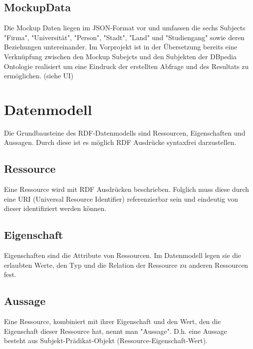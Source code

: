 \subsection*{MockupData}

Die Mockup Daten liegen im JSON-Format vor und umfassen die sechs Subjects "Firma", "Universität", "Person", "Stadt", "Land" und "Studiengang" sowie deren Beziehungen untereinander.
Im Vorprojekt ist in der Übersetzung bereits eine Verknüpfung zwischen den Mockup Subejcts und den Subjekten der DBpedia Ontologie realisiert um eine Eindruck der erstellten Abfrage und des Resultats zu ermöglichen. (siehe UI)

\section{Datenmodell}

Die Grundbausteine des RDF-Datenmodells sind Ressourcen, Eigenschaften und Aussagen. Durch diese ist es möglich RDF Ausdrücke syntaxfrei darzustellen.

\subsection*{Ressource}

Eine Ressource wird mit RDF Ausdrücken beschrieben. Folglich muss diese durch eine URI (Universal Resource Identifier) referenzierbar sein und eindeutig von dieser identifiziert werden können.

\subsection*{Eigenschaft}

Eigenschaften sind die Attribute von Ressourcen. Im Datenmodell legen sie die erlaubten Werte, den Typ und die Relation der Ressource zu anderen Ressourcen fest.

\subsection*{Aussage}

Eine Ressource, kombiniert mit ihrer Eigenschaft und den Wert, den die Eigenschaft dieser Ressource hat, nennt man "Aussage". D.h. eine Aussage besteht aus Subjekt-Prädikat-Objekt (Ressource-Eigenschaft-Wert).

